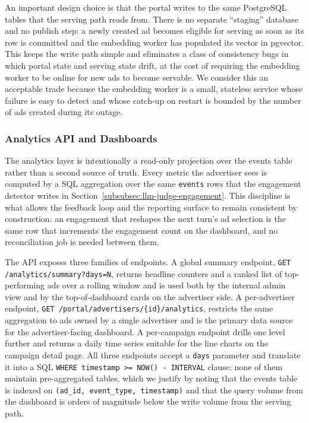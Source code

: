 An important design choice is that the portal writes to the same
PostgreSQL tables that the serving path reads from. There is no separate
``staging'' database and no publish step: a newly created ad becomes
eligible for serving as soon as its row is committed and the embedding
worker has populated its vector in pgvector. This keeps the write path
simple and eliminates a class of consistency bugs in which portal state
and serving state drift, at the cost of requiring the embedding worker
to be online for new ads to become servable. We consider this an
acceptable trade because the embedding worker is a small, stateless
service whose failure is easy to detect and whose catch-up on restart is
bounded by the number of ads created during its outage.

\subsubsection{Analytics API and Dashboards}
\label{subsubsec:analytics-api}

The analytics layer is intentionally a read-only projection over the
events table rather than a second source of truth. Every metric the
advertiser sees is computed by a SQL
aggregation over the same \texttt{events} rows that the engagement
detector writes in Section~\ref{subsubsec:llm-judge-engagement}. This
discipline is what allows the feedback loop and the reporting surface
to remain consistent by construction: an engagement that reshapes the
next turn's ad selection is the same row that increments the
engagement count on the dashboard, and no reconciliation job is needed
between them.

The API exposes three families of endpoints. A global summary endpoint,
\texttt{GET /analytics/summary?days=N}, returns headline counters and a
ranked list of top-performing ads over a rolling window and is used
both by the internal admin view and by the top-of-dashboard cards on
the advertiser side. A per-advertiser endpoint,
\texttt{GET /portal/advertisers/\{id\}/analytics}, restricts the same
aggregation to ads owned by a single advertiser and is the primary data
source for the advertiser-facing dashboard. A per-campaign endpoint
drills one level further and returns a daily time series suitable for
the line charts on the campaign detail page. All three endpoints accept
a \texttt{days} parameter and translate it into a SQL
\texttt{WHERE timestamp >= NOW() - INTERVAL} clause; none of them
maintain pre-aggregated tables, which we justify by noting that the
events table is indexed on
\texttt{(ad\_id, event\_type, timestamp)} and that the query volume
from the dashboard is orders of magnitude below the write volume from
the serving path.

